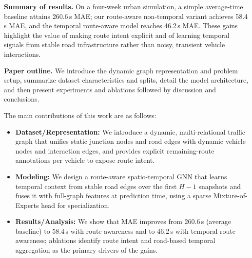 \noindent\textbf{Summary of results.} On a four-week urban simulation, a simple average-time baseline attains 260.6\,s MAE; our route-aware non-temporal variant achieves 58.4\,s MAE, and the temporal route-aware model reaches 46.2\,s MAE. These gains highlight the value of making route intent explicit and of learning temporal signals from stable road infrastructure rather than noisy, transient vehicle interactions.

\noindent\textbf{Paper outline.} We introduce the dynamic graph representation and problem setup, summarize dataset characteristics and splits, detail the model architecture, and then present experiments and ablations followed by discussion and conclusions.

The main contributions of this work are as follows:
\begin{itemize}
    \item \textbf{Dataset/Representation:} We introduce a dynamic, multi-relational traffic graph that unifies static junction nodes and road edges with dynamic vehicle nodes and interaction edges, and provides explicit remaining-route annotations per vehicle to expose route intent. 
    \item \textbf{Modeling:} We design a route-aware spatio-temporal GNN that learns temporal context from stable road edges over the first $H{-}1$ snapshots and fuses it with full-graph features at prediction time, using a sparse Mixture-of-Experts head for specialization. 
    \item \textbf{Results/Analysis:} We show that MAE improves from 260.6\,s (average baseline) to 58.4\,s with route awareness and to 46.2\,s with temporal route awareness; ablations identify route intent and road-based temporal aggregation as the primary drivers of the gains. 
\end{itemize}
